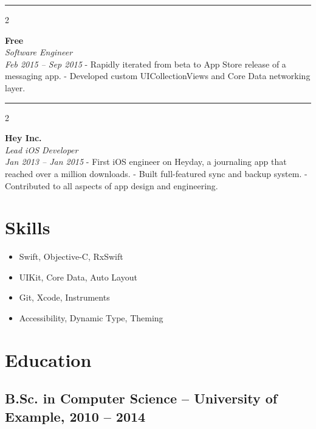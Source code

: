 \documentclass[11pt]{article}
\begin{document}
\vspace{1em}\hrule\vspace{1em}
\begin{multicols}{2}

\textbf{Free} \\
\textit{Software Engineer} \\
\textit{Feb 2015 -- Sep 2015}
\columnbreak
- Rapidly iterated from beta to App Store release of a messaging app.
- Developed custom UICollectionViews and Core Data networking layer.

\end{multicols}
\vspace{1em}\hrule\vspace{1em}
\begin{multicols}{2}

\textbf{Hey Inc.} \\
\textit{Lead iOS Developer} \\
\textit{Jan 2013 -- Jan 2015}
\columnbreak
- First iOS engineer on Heyday, a journaling app that reached over a million downloads.
- Built full-featured sync and backup system.
- Contributed to all aspects of app design and engineering.

\end{multicols}

\section*{Skills}
\label{sec:org0e7a1d8}
\begin{itemize}
\item Swift, Objective-C, RxSwift
\item UIKit, Core Data, Auto Layout
\item Git, Xcode, Instruments
\item Accessibility, Dynamic Type, Theming
\end{itemize}

\section*{Education}
\label{sec:org6ab67d9}
\subsection*{B.Sc. in Computer Science -- University of Example, 2010 -- 2014}
\label{sec:orgb804803}
\end{document}
